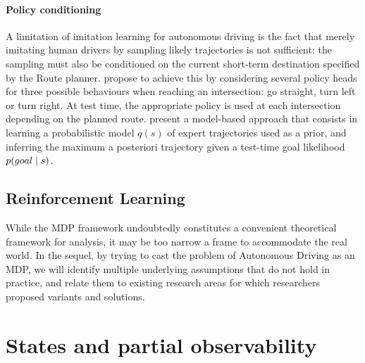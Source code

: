 \paragraph{Policy conditioning} A limitation of imitation learning for autonomous driving is the fact that merely imitating human drivers by sampling likely trajectories is not sufficient: the sampling must also be conditioned on the current short-term destination specified by the Route planner. \citet{Codevilla2018} propose to achieve this by considering several policy heads for three possible behaviours when reaching an intersection: go straight, turn left or turn right. At test time, the appropriate policy is used at each intersection depending on the planned route. \citet{Rhinehart2019,Rhinehart2020} present a model-based approach that consists in learning a probabilistic model $q(s)$ of expert trajectories used as a prior, and inferring the maximum a posteriori trajectory given a test-time goal likelihood $p\lparen goal\mid s\rparen$.

\subsection{Reinforcement Learning}

While the \gls{MDP} framework undoubtedly constitutes a convenient theoretical framework for analysis, it may be too narrow a frame to accommodate the real world. In the sequel, by trying to cast the problem of Autonomous Driving as an \gls{MDP}, we will identify multiple underlying assumptions that do not hold in practice, and relate them to existing research areas for which researchers proposed variants and solutions.

\section{States and partial observability}
\label{sec:partial-observability}

